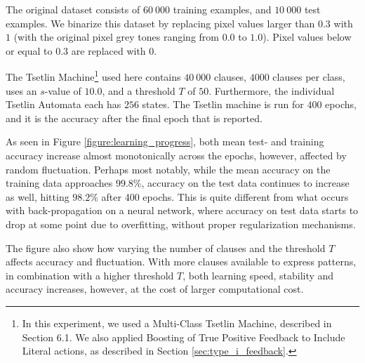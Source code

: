 \documentclass[11pt,a4paper]{article}
\begin{document}
The original dataset consists of $60~000$ training examples, and $10~000$ test examples. We binarize this dataset by replacing pixel values larger than $0.3$ with $1$ (with the original pixel grey tones ranging from $0.0$ to $1.0$). Pixel values below or equal to $0.3$ are replaced with $0$. 

The Tsetlin Machine\footnote{In this experiment, we used a Multi-Class Tsetlin Machine, described in Section 6.1.  We also applied Boosting of True  Positive  Feedback  to  Include  Literal  actions, as described in Section \ref{sec:type_i_feedback}.} used here contains $40~000$ clauses, $4000$ clauses per class, uses an $s$-value of $10.0$, and a threshold $T$ of $50$. Furthermore, the individual Tsetlin Automata each has $256$ states. The Tsetlin machine is run for $400$ epochs, and it is the accuracy after the final epoch that is reported.

As seen in Figure \ref{figure:learning_progress}, both mean test- and training accuracy increase almost monotonically across the epochs, however, affected by random fluctuation. Perhaps most notably, while the mean accuracy on the training data approaches 
$99.8$\%, accuracy on the test data continues to increase as well, hitting $98.2$\% after 400 epochs. This is quite different from what occurs with back-propagation on a neural network, where accuracy on test data starts to drop at some point due to overfitting, without proper regularization mechanisms.

The figure also show how varying the number of clauses and the threshold $T$ affects accuracy and fluctuation. With more clauses available to express patterns, in combination with a higher threshold $T$, both learning speed, stability and accuracy increases, however, at the cost of larger computational cost.
\end{document}
